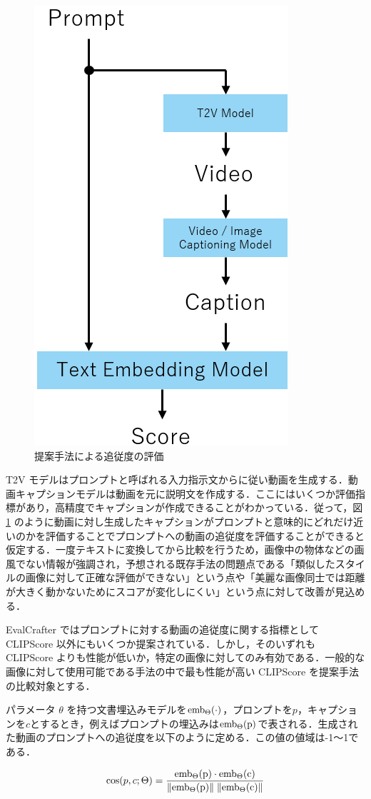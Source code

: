\documentclass[11pt,a4j]{jreport}
\begin{document}
\begin{figure}[ht]
    \centering
    \includegraphics[width=0.3\linewidth]{OurMethod.png}
    \caption{提案手法による追従度の評価}
    \label{fig:OurMethod}
\end{figure}

T2V モデルはプロンプトと呼ばれる入力指示文からに従い動画を生成する．動画キャプションモデルは動画を元に説明文を作成する．ここにはいくつか評価指標があり，高精度でキャプションが作成できることがわかっている．従って，図 \ref{fig:OurMethod} のように動画に対し生成したキャプションがプロンプトと意味的にどれだけ近いのかを評価することでプロンプトへの動画の追従度を評価することができると仮定する．一度テキストに変換してから比較を行うため，画像中の物体などの画風でない情報が強調され，予想される既存手法の問題点である「類似したスタイルの画像に対して正確な評価ができない」という点や「美麗な画像同士では距離が大きく動かないためにスコアが変化しにくい」という点に対して改善が見込める．

EvalCrafter \cite{liu2023evalcrafter} ではプロンプトに対する動画の追従度に関する指標として CLIPScore \cite{hessel2021clipscore} 以外にもいくつか提案されている．しかし，そのいずれも CLIPScore よりも性能が低いか，特定の画像に対してのみ有効である．一般的な画像に対して使用可能である手法の中で最も性能が高い CLIPScore を提案手法の比較対象とする．

パラメータ $\theta$ を持つ文書埋込みモデルを$\rm{emb}_\Theta(\cdot)$，プロンプトを$p$，キャプションを$c$とするとき，例えばプロンプトの埋込みは$\rm{emb}_\Theta(p)$で表される．生成された動画のプロンプトへの追従度を以下のように定める．この値の値域は-1～1である．

\begin{equation}\cos(p,c;\Theta)=\frac{\rm{emb}_\Theta(p)\cdot \rm{emb}_\Theta(c)}{\|\rm{emb}_\Theta(p)\|\;\|\rm{emb}_\Theta(c)\|}\end{equation}
\label{eq:cos}
\end{document}
